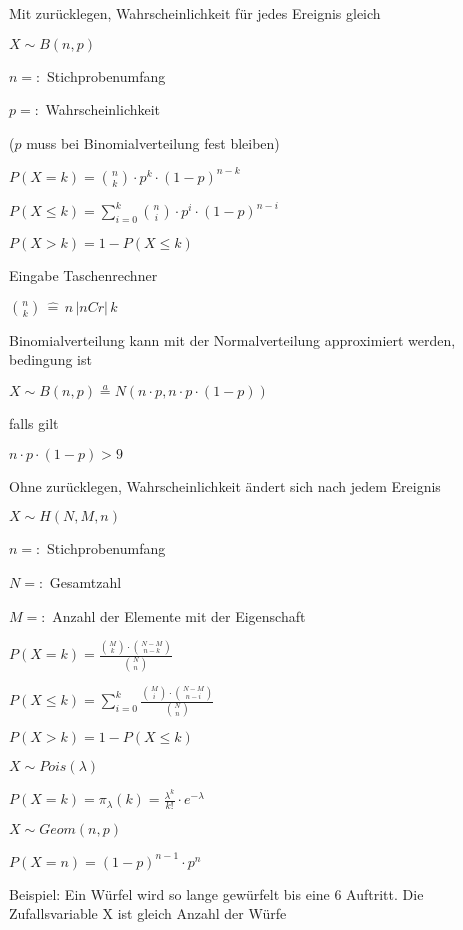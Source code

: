 \documentclass[10pt,a4paper,landscape]{article}
\begin{document}
\begin{multicols*}{4}
\parbox{\columnwidth}{\centering Mit zurücklegen, Wahrscheinlichkeit für jedes Ereignis gleich }
\parbox{\columnwidth}{\centering $X \sim B(n,p)$}
\parbox{\columnwidth}{\centering $n =:$ Stichprobenumfang}
\parbox{\columnwidth}{\centering $p =:$ Wahrscheinlichkeit}
\parbox{\columnwidth}{\centering ($p$ muss bei Binomialverteilung fest bleiben)}
\parbox{\columnwidth}{\centering $P(X=k) = \binom{n}{k} \cdot p^k \cdot (1-p)^{n-k}$}
\parbox{\columnwidth}{\centering $P(X \leq k) = \sum \limits_{i=0}^k\binom{n}{i} \cdot p^i \cdot (1-p)^{n-i}$}
\parbox{\columnwidth}{\centering $P(X > k) = 1 - P(X \leq k)$}
\parbox{\columnwidth}{\centering Eingabe Taschenrechner}
\parbox{\columnwidth}{\centering $\binom{n}{k} \, \widehat{=} \, n \, \vert nCr \vert \, k$}
\parbox{\columnwidth}{\centering Binomialverteilung kann mit der Normalverteilung approximiert werden, bedingung ist}
\parbox{\columnwidth}{\centering $X \sim B(n, p) \stackrel{a}{=} N(n \cdot p, n \cdot p \cdot (1-p))$}
\parbox{\columnwidth}{\centering falls gilt}
\parbox{\columnwidth}{\centering $n \cdot p \cdot (1-p) > 9$}

\parbox{\columnwidth}{\centering Ohne zurücklegen, Wahrscheinlichkeit ändert sich nach jedem Ereignis}
\parbox{\columnwidth}{\centering $X \sim H(N, M, n)$}
\parbox{\columnwidth}{\centering $n =:$ Stichprobenumfang}
\parbox{\columnwidth}{\centering $N =:$ Gesamtzahl}
\parbox{\columnwidth}{\centering $M =:$ Anzahl der Elemente mit der Eigenschaft}
\parbox{\columnwidth}{\centering $P(X = k) = \frac{\binom{M}{k} \cdot \binom{N-M}{n-k}}{\binom{N}{n}} $}
\parbox{\columnwidth}{\centering $P(X \leq k) = \sum \limits_{i=0}^k \frac{\binom{M}{i} \cdot \binom{N-M}{n-i}}{\binom{N}{n}} $}
\parbox{\columnwidth}{\centering $P(X > k) = 1 - P(X \leq k)$}

\parbox{\columnwidth}{\centering $X \sim Pois(\lambda)$}
\parbox{\columnwidth}{\centering $P(X = k) = \pi_\lambda(k) = \frac{\lambda^k}{k!} \cdot e^{-\lambda}$}

\parbox{\columnwidth}{\centering $X \sim Geom(n, p)$}
\parbox{\columnwidth}{\centering $P(X = n) = (1-p)^{n-1} \cdot p^n$}
\parbox{\columnwidth}{\centering Beispiel: Ein Würfel wird so lange gewürfelt bis eine 6 Auftritt. Die Zufallsvariable X ist gleich Anzahl der Würfe}

\subsection{}


\end{multicols*}
\end{document}
